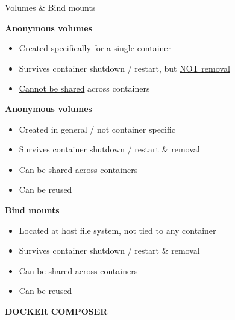 \documentclass[10pt]{article}
\newcommand{\summary}[2]{\begin{summarybox}{#1}
  #2
  \vspace*{-1.3em}
\end{summarybox}}
\newcommand{\headline}[1]{\textbf{\color{teal}#1}}
\newcommand{\feature}[2]{
  \headline{#1}
  \vspace*{-.5em}
  \begin{itemize}
    \setlength\itemsep{-.1em}
    \small
    #2
  \end{itemize}
  \vspace*{.3em}
}
\newcommand{\mytitle}[1]{
  \begin{center}
    \begin{titlebox}
      {\large \textbf{#1}}
    \end{titlebox}
  \end{center}
  \vspace*{-1.8em}
}
\begin{document}
\begin{multicols*}{2}
  \summary{Volumes \& Bind mounts}{
    \feature{Anonymous volumes}{
      \item Created specifically for a single container
      \item Survives container shutdown / restart, but \underline{NOT removal}
      \item \underline{Cannot be shared} across containers
    }
    \feature{Anonymous volumes}{
      \item Created in general / not container specific
      \item Survives container shutdown / restart \& removal
      \item \underline{Can be shared} across containers
      \item Can be reused
    }
    \feature{Bind mounts}{
      \item Located at host file system, not tied to any container
      \item Survives container shutdown / restart \& removal
      \item \underline{Can be shared} across containers
      \item Can be reused
    }
  }
\end{multicols*}

\newpage

\mytitle{DOCKER COMPOSER}

\begin{multicols*}{2}



\end{multicols*}
\end{document}
